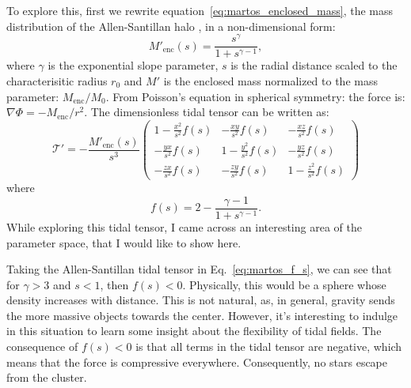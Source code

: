             To explore this, first we rewrite equation~\ref{eq:martos_enclosed_mass}, the mass distribution of the Allen-Santillan halo \citep{1986RMxAA..13..137A,1991RMxAA..22..255A}, in a non-dimensional form:
            \begin{equation}
                M'_\text{enc}(s) = \frac{s^\gamma}{1+s^{\gamma-1}},
            \end{equation}
            where $\gamma$ is the exponential slope parameter, $s$ is the radial distance scaled to the characterisitic radius $r_0$ and $M'$ is the enclosed mass normalized to the mass parameter: $M_\mathrm{enc}/M_0$. From Poisson's equation in spherical symmetry: the force is: $\nabla \Phi = - M_\mathrm{enc}/r^2$. The dimensionless tidal tensor can be written as: 
            \begin{equation}
                \mathcal{T'}= -\frac{M'_\text{enc}(s)}{s^3}\left(\begin{matrix}
                    1-\frac{x^2}{s^2}f(s) & -\frac{xy}{s^2}f(s) & -\frac{xz}{s^2}f(s) \\
                    -\frac{yx}{s^2}f(s) & 1-\frac{y^2}{s^2}f(s) & -\frac{yz}{s^2}f(s) \\
                    -\frac{zx}{s^2}f(s) & -\frac{zy}{s^2}f(s) & 1-\frac{z^2}{s^2}f(s)
                \end{matrix}\right)
            \end{equation}  
            where 
            \begin{equation}
                f(s) = 2-\frac{\gamma-1}{1+s^{\gamma-1}}.
                \label{eq:martos_f_s}
            \end{equation}
            While exploring this tidal tensor, I came across an interesting area of the parameter space, that I would like to show here. 

            Taking the Allen-Santillan tidal tensor in Eq.~\ref{eq:martos_f_s}, we can see that for $\gamma > 3$ and $s <  1$, then $f(s)< 0$. Physically, this would be a sphere whose density increases with distance. This is not natural, as, in general, gravity sends the more massive objects towards the center. However, it's interesting to indulge in this situation to learn some insight about the flexibility of tidal fields. The consequence of $f(s)< 0$ is that all terms in the tidal tensor are negative, which means that the force is compressive everywhere. Consequently, no stars escape from the cluster. 

